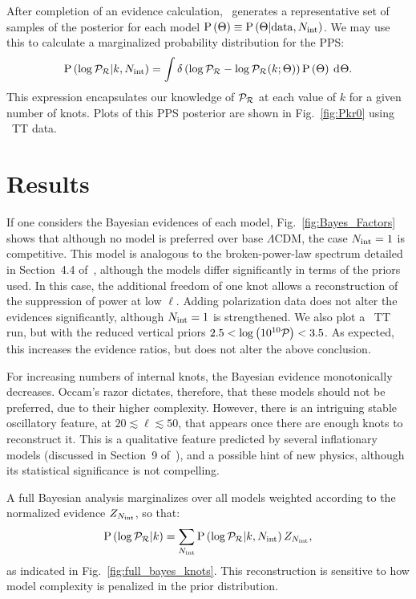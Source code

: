After completion of an evidence calculation, \PolyChord\ generates a representative set of samples of the posterior for each model \(\mathrm{P}\left(\Theta\right) \equiv \mathrm{P}\left(\Theta\middle|\mathrm{data},N_\mathrm{int}\right)\). We may use this to calculate a marginalized probability distribution for the PPS\@:
\begin{equation}
    \mathrm{P}\left(\log\mathcal{P}_{\mathcal{R}}\middle|k,N_\mathrm{int}\right) = \int \delta\left(\log\mathcal{P}_{\mathcal{R}} - \log\mathcal{P}_{\mathcal{R}}(k;\Theta)\right)\mathrm{P}\left(\Theta\right)\:\operatorname{d}^{}\!{\Theta}.
  \label{eqn:margPR}
\end{equation}
This expression encapsulates our knowledge of \(\mathcal{P}_{\mathcal{R}}\) at each value of \(k\) for a given number of knots.  Plots of this PPS posterior are shown in Fig.~\ref{fig:Pkr0} using \Planck\ TT data.


\section{Results}
If one considers the Bayesian evidences of each model, Fig.~\ref{fig:Bayes_Factors} shows that although no model is preferred over base \(\Lambda\)CDM, the case \(N_\mathrm{int}=1\) is competitive. This model is analogous to the broken-power-law spectrum detailed in Section~4.4 of~\cite{planck2015-a1}, although the models differ significantly in terms of the priors used. In this case, the additional freedom of one knot allows a reconstruction of the suppression of power at low \(\ell\). Adding polarization data does not alter the evidences significantly, although \(N_\mathrm{int}=1\) is strengthened. We also plot a \Planck\ TT run, but with the reduced vertical priors \({2.5<\log\left(10^{10}\mathcal{P}_{}\right)<3.5}\).  As expected, this increases the evidence ratios, but does not alter the above conclusion.

For increasing numbers of internal knots, the Bayesian evidence monotonically decreases. Occam's razor dictates, therefore, that these models should not be preferred, due to their higher complexity. However, there is an intriguing stable oscillatory feature, at \(20\lesssim\ell\lesssim50\), that appears once there are enough knots to reconstruct it.  This is a qualitative feature predicted by several inflationary models (discussed in Section~9 of~\citealp{planck2015-a1}), and a possible hint of new physics, although its statistical significance is not compelling.

A full Bayesian analysis marginalizes over all models weighted according to the normalized evidence \(Z_{N_\mathrm{int}}\), so that:
\begin{equation}
    \mathrm{P}\left(\log\mathcal{P}_{\mathcal{R}}\middle|k\right) = \sum\limits_{N_\mathrm{int}} \mathrm{P}\left(\log\mathcal{P}_{\mathcal{R}}\middle|k,N_\mathrm{int}\right) Z_{N_\mathrm{int}},
  \label{eqn:margPR_full}
\end{equation}
as indicated in Fig.~\ref{fig:full_bayes_knots}.  This reconstruction is sensitive to how model complexity is penalized in the prior distribution. 

